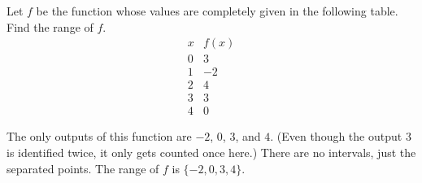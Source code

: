 \documentclass[nooutcomes]{ximera}
\begin{document}
	\begin{example}
		Let $f$ be the function whose values are completely given in the following table. Find the range of $f$.
		$$ \begin{array}{c|c}
			  x & f(x)\\\hline
			  0 & 3\\
			  1 & -2\\
			  2 & 4\\
			  3 & 3\\
			  4 & 0
		\end{array}$$

		\begin{explanation}

			The only outputs of this function are $-2$, $0$, $3$, and $4$. 
			(Even though the output $3$ is identified twice, it only gets counted once here.) 
			There are no intervals, just the separated points. The range of $f$ is $\{ -2, 0, 3, 4 \}$.
		\end{explanation}	
	\end{example}
	
\end{document}

